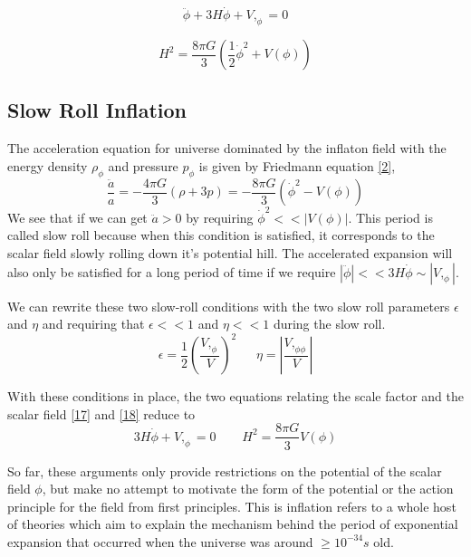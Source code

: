\documentclass[aps,prd,reprint,preprintnumbers,showpacs,floatfix,nofootinbib,superscript address]{revtex4-2}
\begin{document}
\begin{equation} \label{17}
    \ddot{\phi} + 3H\dot{\phi} + V,_\phi = 0
\end{equation}

\begin{equation} \label{18}
    H^2 = \frac{8\pi G}{3} \left(\frac{1}{2} {\dot{\phi}}^2 + V(\phi) \right)
\end{equation}

\subsection{Slow Roll Inflation}
The acceleration equation for universe dominated by the inflaton field with the energy density $\rho_{\phi}$ and pressure $p_{\phi}$ is given by Friedmann equation \ref{2},
\begin{equation}
    \frac{\ddot{a}}{a} = -\frac{4\pi G}{3} (\rho +3p) = -\frac{8\pi G}{3} ({\dot{\phi}}^2 - V(\phi)) 
\end{equation}
We see that if we can get $\ddot{a} > 0$ by requiring $\dot{\phi}^2 << |V(\phi)|$. This period is called slow roll because when this condition is satisfied, it corresponds to the scalar field slowly rolling down it's potential hill. The accelerated expansion will also only be satisfied for a long period of time if we require $|\ddot{\phi}| << 3H\dot{\phi} \sim |V,_{\phi}|$. 

We can rewrite these two slow-roll conditions with the two slow roll parameters $\epsilon$ and $\eta$ and requiring that $\epsilon << 1$ and $\eta << 1$ during the slow roll. 
\begin{equation}
    \epsilon = \frac{1}{2}  \left( \frac{V,_{\phi}}{V} \right)^2 \,\,\,\,\,\,\,\,\ \eta = \left| \frac{V,_{\phi\phi}}{V} \right|
\end{equation}

With these conditions in place, the two equations relating the scale factor and the scalar field \ref{17} and \ref{18} reduce to
\begin{equation}  \label{21}
    3H\dot{\phi} + V,_{\phi} = 0 \,\,\,\,\,\,\,\,\,\,\,\  H^2 = \frac{8\pi G}{3} V(\phi)
\end{equation}

So far, these arguments only provide restrictions on the potential of the scalar field $\phi$, but make no attempt to motivate the form of the potential or the action principle for the field from first principles. This is inflation refers to a whole host of theories which aim to explain the mechanism behind the period of exponential expansion that occurred when the universe was around $\geq 10^{-34}s$ old.
\end{document}
